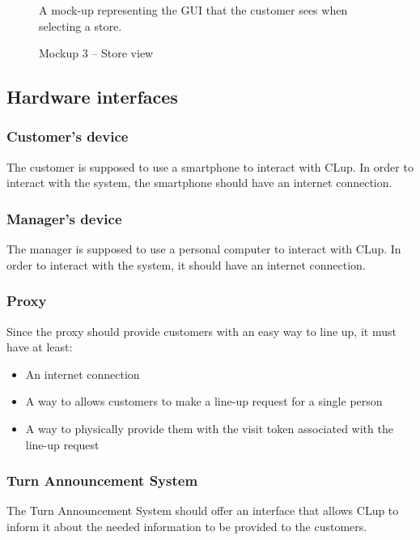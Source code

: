 \documentclass[a4paper,oneside,11pt]{book}   %
\newcommand{\captionrasd}[2]{\caption{#1}\par\begin{center}\vspace{-.01\textheight}\small#2.\end{center}}
\begin{document}
\begin{figure}[H]
\begin{minipage}[b]{0.42\textwidth}
            \captionrasd{Mockup 3 -- Store view}{A mock-up representing the GUI that the customer sees when selecting a store}
            \vspace{0.0194\textheight}
        \end{minipage}
        \hspace{0.025\textwidth}
    \end{figure}

    \subsection{Hardware interfaces}
    \subsubsection{Customer's device} 
    The customer is supposed to use a smartphone to interact with CLup. In order to interact with the system, the smartphone should have an internet connection.
    
    \subsubsection{Manager's device} 
    The manager is supposed to use a personal computer to interact with CLup. In order to interact with the system, it should have an internet connection.
    
    \subsubsection{Proxy} 
    Since the proxy should provide customers with an easy way to line up, it must have at least:
    \begin{itemize}
        \item An internet connection
        \item A way to allows customers to make a line-up request for a single person
        \item A way to physically provide them with the visit token associated with the line-up request
    \end{itemize}
    
    \subsubsection{Turn Announcement System}
    The Turn Announcement System should offer an interface that allows CLup to inform it about the needed information to be provided to the customers.
    
\end{document}
